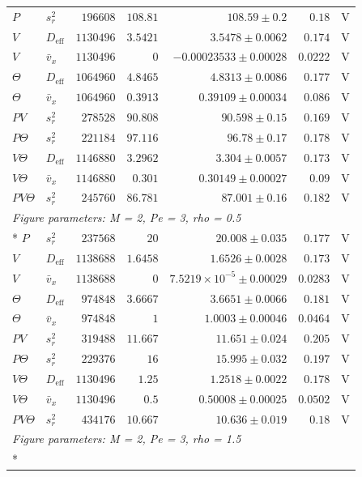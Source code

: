 \begin{longtable}{llrrrrc}
$P$ & $s_r^2$ & $196608$ & $108.81$ & $108.59 \pm 0.2$ & $0.18$ & V \\
$V$ & $D_{\mathrm{eff}}$ & $1130496$ & $3.5421$ & $3.5478 \pm 0.0062$ & $0.174$ & V \\
$V$ & $\bar v_x$ & $1130496$ & $0$ & $-0.00023533 \pm 0.00028$ & $0.0222$ & V \\
$\Theta$ & $D_{\mathrm{eff}}$ & $1064960$ & $4.8465$ & $4.8313 \pm 0.0086$ & $0.177$ & V \\
$\Theta$ & $\bar v_x$ & $1064960$ & $0.3913$ & $0.39109 \pm 0.00034$ & $0.086$ & V \\
$PV$ & $s_r^2$ & $278528$ & $90.808$ & $90.598 \pm 0.15$ & $0.169$ & V \\
$P\Theta$ & $s_r^2$ & $221184$ & $97.116$ & $96.78 \pm 0.17$ & $0.178$ & V \\
$V\Theta$ & $D_{\mathrm{eff}}$ & $1146880$ & $3.2962$ & $3.304 \pm 0.0057$ & $0.173$ & V \\
$V\Theta$ & $\bar v_x$ & $1146880$ & $0.301$ & $0.30149 \pm 0.00027$ & $0.09$ & V \\
$PV\Theta$ & $s_r^2$ & $245760$ & $86.781$ & $87.001 \pm 0.16$ & $0.182$ & V \\
\multicolumn{7}{l}{\textit{Figure parameters: M = 2, Pe = 3, rho = 0.5}} \\*
$P$ & $s_r^2$ & $237568$ & $20$ & $20.008 \pm 0.035$ & $0.177$ & V \\
$V$ & $D_{\mathrm{eff}}$ & $1138688$ & $1.6458$ & $1.6526 \pm 0.0028$ & $0.173$ & V \\
$V$ & $\bar v_x$ & $1138688$ & $0$ & $7.5219\times10^{-5} \pm 0.00029$ & $0.0283$ & V \\
$\Theta$ & $D_{\mathrm{eff}}$ & $974848$ & $3.6667$ & $3.6651 \pm 0.0066$ & $0.181$ & V \\
$\Theta$ & $\bar v_x$ & $974848$ & $1$ & $1.0003 \pm 0.00046$ & $0.0464$ & V \\
$PV$ & $s_r^2$ & $319488$ & $11.667$ & $11.651 \pm 0.024$ & $0.205$ & V \\
$P\Theta$ & $s_r^2$ & $229376$ & $16$ & $15.995 \pm 0.032$ & $0.197$ & V \\
$V\Theta$ & $D_{\mathrm{eff}}$ & $1130496$ & $1.25$ & $1.2518 \pm 0.0022$ & $0.178$ & V \\
$V\Theta$ & $\bar v_x$ & $1130496$ & $0.5$ & $0.50008 \pm 0.00025$ & $0.0502$ & V \\
$PV\Theta$ & $s_r^2$ & $434176$ & $10.667$ & $10.636 \pm 0.019$ & $0.18$ & V \\
\multicolumn{7}{l}{\textit{Figure parameters: M = 2, Pe = 3, rho = 1.5}} \\*

\end{longtable}
